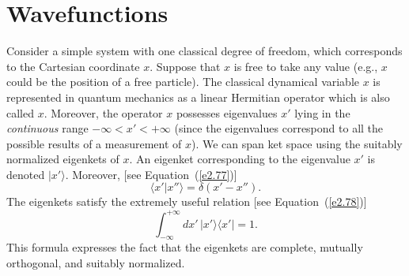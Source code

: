 \section{Wavefunctions}
Consider a simple system with one classical degree of freedom, which corresponds to
the Cartesian coordinate $x$. Suppose that $x$ is free to take any value ({\rm e.g.},
$x$ could be the position of a free particle). The classical dynamical variable
$x$ is represented in quantum 
mechanics  as a linear Hermitian operator which is also called  $x$.
Moreover, the operator $x$ possesses eigenvalues $x'$
lying in the {\em continuous}
range $-\infty< x'<+\infty$ (since the eigenvalues
correspond to all the possible results of a measurement of $x$). We can
span ket space using the suitably normalized eigenkets of $x$.
An eigenket corresponding to the eigenvalue $x'$ is denoted $|x'\rangle$.
Moreover, 
[see Equation~(\ref{e2.77})]
\begin{equation}\label{e3.15}
\langle x' | x''\rangle = \delta(x'-x'').
\end{equation}
The eigenkets satisfy the extremely useful relation [see Equation~(\ref{e2.78})]
\begin{equation}\label{e3.16}
\int_{-\infty}^{+\infty} d x' \, |x'\rangle\langle x'|= 1.
\end{equation}
This formula expresses the fact that the eigenkets are complete, mutually
orthogonal, and suitably normalized.

